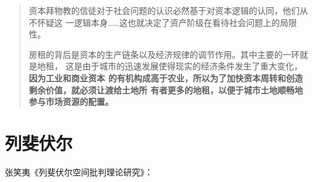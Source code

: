 \begin{quotation}
  资本拜物教的信徒对于社会问题的认识必然基于对资本逻辑的认同，他们从不怀疑这
  一逻辑本身……这也就决定了资产阶级在看待社会问题上的局限
  性。

  房租的背后是资本的生产链条以及经济规律的调节作用。其中主要的一环就是地租，
  这是由于城市的迅速发展使得现实的经济条件发生了重大变化，\textbf{因为工业和商业资本
  的有机构成高于农业，所以为了加快资本周转和创造剩余价值，就必须让渡给土地所
  有者更多的地租，以便于城市土地顺畅地参与市场资源的配置。}
\end{quotation}

\section{列斐伏尔}

张笑夷《列斐伏尔空间批判理论研究》：
